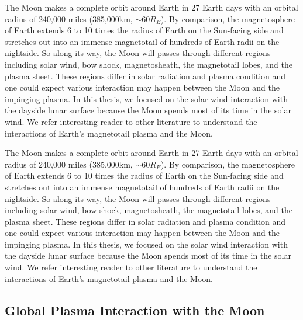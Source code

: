 The Moon makes a complete orbit around Earth in 27 Earth days with an orbital radius of 240,000 miles (385,000km, $\sim 60 R_E$). By comparison, the magnetosphere of Earth extends 6 to 10 times the radius of Earth on the Sun-facing side and stretches out into an immense magnetotail of hundreds of Earth radii on the nightside. So along its way, the Moon will passes through different regions including solar wind, bow shock, magnetosheath, the magnetotail lobes, and the plasma sheet. These regions differ in solar radiation and plasma condition and one could expect various interaction may happen between the Moon and the impinging plasma. In this thesis, we focused on the solar wind interaction with the dayside lunar surface because the Moon spends most of its time in the solar wind. We refer interesting reader to other literature \citep{haradaInteractionsEarthMagnetotail2015} to understand the interactions of Earth's magnetotail plasma and the Moon.


The Moon makes a complete orbit around Earth in 27 Earth days with an orbital radius of 240,000 miles (385,000km, $\sim 60 R_E$). By comparison, the magnetosphere of Earth extends 6 to 10 times the radius of Earth on the Sun-facing side and stretches out into an immense magnetotail of hundreds of Earth radii on the nightside. So along its way, the Moon will passes through different regions including solar wind, bow shock, magnetosheath, the magnetotail lobes, and the plasma sheet. These regions differ in solar radiation and plasma condition and one could expect various interaction may happen between the Moon and the impinging plasma. In this thesis, we focused on the solar wind interaction with the dayside lunar surface because the Moon spends most of its time in the solar wind. We refer interesting reader to other literature \citep{haradaInteractionsEarthMagnetotail2015} to understand the interactions of Earth's magnetotail plasma and the Moon.


\subsection{Global Plasma Interaction with the Moon}

